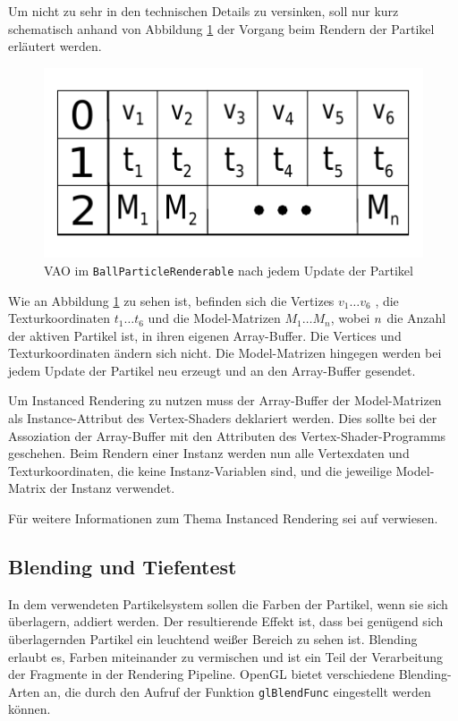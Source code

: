 Um nicht zu sehr in den technischen Details zu versinken, soll nur kurz schematisch anhand von Abbildung \ref{fig:vao} der Vorgang beim Rendern der Partikel erläutert werden.

\begin{figure}[h]
	\centering
	\includegraphics[scale=0.8]{bilder/vao}
	\caption{VAO im {\texttt{BallParticleRenderable}} nach jedem Update der Partikel}
	\label{fig:vao}
\end{figure}

Wie an Abbildung \ref{fig:vao} zu sehen ist, befinden sich die Vertizes $v_1\dotsc v_6$ , die Texturkoordinaten $t_1\dotsc t_6$ und die Model-Matrizen $M_1\dotsc M_n$, wobei $\mathnormal{n}$ die Anzahl der aktiven Partikel ist, in ihren eigenen Array-Buffer. Die Vertices und Texturkoordinaten ändern sich nicht. Die Model-Matrizen hingegen werden bei jedem Update der Partikel neu erzeugt und an den Array-Buffer gesendet.

Um Instanced Rendering zu nutzen muss der Array-Buffer der Model-Matrizen als Instance-Attribut des Vertex-Shaders deklariert werden. Dies sollte bei der Assoziation der Array-Buffer mit den Attributen des Vertex-Shader-Programms geschehen.
Beim Rendern einer Instanz werden nun alle Vertexdaten und Texturkoordinaten, die keine Instanz-Variablen sind, und die jeweilige Model-Matrix der Instanz verwendet.

Für weitere Informationen zum Thema Instanced Rendering sei auf \cite{ksls:2013} verwiesen.

\subsection{Blending und Tiefentest}
\label{Kapitel_2_-_Unterkapitel_2.3}
%
In dem verwendeten Partikelsystem sollen die Farben der Partikel, wenn sie sich überlagern, addiert werden. Der resultierende Effekt ist, dass bei genügend sich überlagernden Partikel ein leuchtend weißer Bereich zu sehen ist. Blending erlaubt es, Farben miteinander zu vermischen und ist ein Teil der Verarbeitung der Fragmente in der Rendering Pipeline. OpenGL bietet verschiedene Blending-Arten an, die durch den Aufruf der Funktion {\texttt{glBlendFunc}} eingestellt werden können. 

